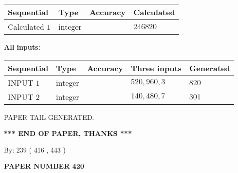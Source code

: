 \documentclass{ctexart}
\begin{document}
   
  
  
\noindent\begin{tabular}{|l|l|l|l|}
\hline
 Sequential & Type & Accuracy & Calculated \\ 
\hline
 
 
  Calculated $  1 $ & integer &  & 
  $ 246820 $ 
 \\  \hline  
 \end{tabular}
   
   
   
   
\noindent\vspace{0.1in}\hspace{-0.08in} {\textbf{\Large{All inputs: }}}
   
   
  
  
\noindent\begin{tabular}{|l|l|l|l|l|}
\hline
 Sequential & Type & Accuracy & Three inputs & Generated \\ 
\hline
 
 
  INPUT $  1 $ & integer &  & $
 520
 , 
 960
 , 
 3
 $ & $ 820 $ 
 \\  \hline  
 
 
  INPUT $  2 $ & integer &  & $
 140
 , 
 480
 , 
 7
 $ & $ 301 $ 
 \\  \hline  
 \end{tabular}
   
   
   
   
   
   
 \vspace{0.2in}
 
   
   
\vspace{2.0in} PAPER TAIL GENERATED.
   
   
   
   
\vspace{1.0in} 
{\textbf{\large{ *** END OF PAPER, THANKS *** }}} 
   
   
\hspace{1.0in} By: 
 239 ( 416 ,  443 )
   
   
   
   
\newpage 
\setcounter{page}{ 
   420001 } 
   
   
   
   
 {\textbf{ \Large{ PAPER NUMBER  420  }}}
   
   
\vspace{0.2in}
   
   
   
\end{document}

